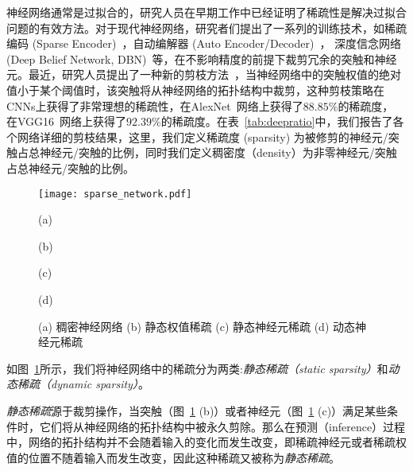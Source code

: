 神经网络通常是过拟合的，研究人员在早期工作中已经证明了稀疏性是解决过拟合问题的有效方法。对于现代神经网络，研究者们提出了一系列的训练技术，如稀疏编码 (Sparse Encoder)~\cite{olshausen1996emergence}，自动编解器 (Auto Encoder/Decoder)~\cite{boureau2008sparse,lee2008sparse}， 深度信念网络 (Deep Belief Network, DBN)~\cite{lee2007efficient}等，在不影响精度的前提下裁剪冗余的突触和神经元。最近，研究人员提出了一种新的剪枝方法~\cite{han2015learning}，当神经网络中的突触权值的绝对值小于某个阈值时，该突触将从神经网络的拓扑结构中裁剪，这种剪枝策略在CNNs上获得了非常理想的稀疏性，在AlexNet~\cite{krizhevsky2012imagenet}网络上获得了$88.85\%$的稀疏度， 在VGG16~\cite{simonyan2014very}网络上获得了$92.39\%$的稀疏度。在表~\ref{tab:deepratio}中，我们报告了各个网络详细的剪枝结果，这里，我们定义稀疏度 (sparsity) 为被修剪的神经元/突触占总神经元/突触的比例，同时我们定义稠密度（density）为非零神经元/突触占总神经元/突触的比例。


\begin{figure}[h]
  \centering
  \begin{minipage}[t]{\columnwidth}
  \texttt{[image: sparse\_network.pdf]}
  \end{minipage}
  \vfill
  \begin{minipage}[t]{0.24\columnwidth}
      \centering\footnotesize
    (a)
  \end{minipage}
  \hfill
  \begin{minipage}[t]{0.24\columnwidth}
      \centering\footnotesize
    (b)
  \end{minipage}
  \hfill
  \begin{minipage}[t]{0.24\columnwidth}
      \centering\footnotesize
    (c)
  \end{minipage}
    \hfill
  \begin{minipage}[t]{0.24\columnwidth}
      \centering\footnotesize
    (d)
  \end{minipage}
  \caption{ (a) 稠密神经网络 (b) 静态权值稀疏 (c) 静态神经元稀疏 (d) 动态神经元稀疏}
  \label{fig:sparsity}
\end{figure}

如图~\ref{fig:sparsity}所示，我们将神经网络中的稀疏分为两类:\emph{静态稀疏（static sparsity）}和\emph{动态稀疏（dynamic sparsity）}。

\emph{静态稀疏}源于裁剪操作，当突触（图~\ref{fig:sparsity} (b)）或者神经元（图~\ref{fig:sparsity} (c)）满足某些条件时，它们将从神经网络的拓扑结构中被永久剪除。那么在预测（inference）过程中，网络的拓扑结构并不会随着输入的变化而发生改变，即稀疏神经元或者稀疏权值的位置不随着输入而发生改变，因此这种稀疏又被称为\emph{静态稀疏}。

